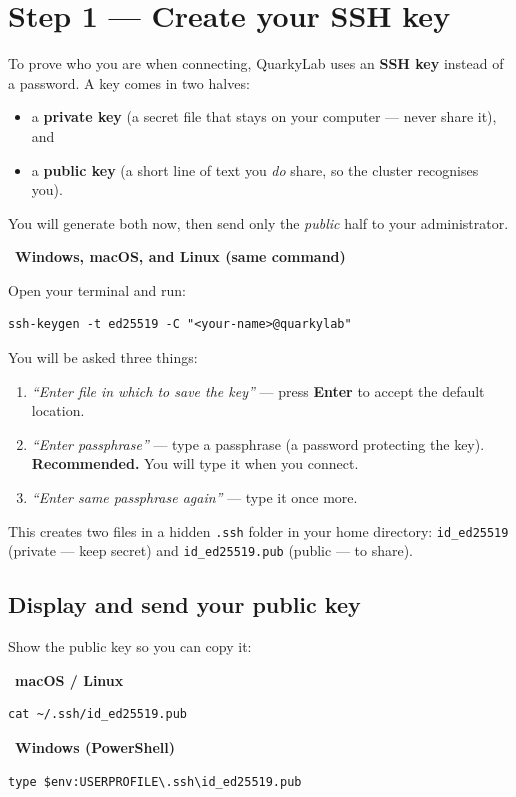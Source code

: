 \documentclass[11pt]{article}
\newcommand{\LabName}{QuarkyLab}                       %
\newcommand{\code}[1]{\texttt{#1}}
\newcommand{\osbadge}[1]{\vspace{0.4ex}\noindent{\color{quarkA}\rule{2pt}{10pt}}\ \textbf{\color{quarkA}#1}\par\nopagebreak\vspace{0.3ex}}
\begin{document}
\section{Step 1 --- Create your SSH key}
To prove who you are when connecting, \LabName{} uses an \textbf{SSH key} instead of a password. A key comes in two halves:
\begin{itemize}
  \item a \textbf{private key} (a secret file that stays on your computer --- never share it), and
  \item a \textbf{public key} (a short line of text you \emph{do} share, so the cluster recognises you).
\end{itemize}
You will generate both now, then send only the \emph{public} half to your administrator.

\osbadge{Windows, macOS, and Linux (same command)}
Open your terminal and run:
\begin{lstlisting}
ssh-keygen -t ed25519 -C "<your-name>@quarkylab"
\end{lstlisting}
You will be asked three things:
\begin{enumerate}
  \item \textit{``Enter file in which to save the key''} --- press \textbf{Enter} to accept the default location.
  \item \textit{``Enter passphrase''} --- type a passphrase (a password protecting the key). \textbf{Recommended.} You will type it when you connect.
  \item \textit{``Enter same passphrase again''} --- type it once more.
\end{enumerate}
This creates two files in a hidden \code{.ssh} folder in your home directory: \code{id\_ed25519} (private --- keep secret) and \code{id\_ed25519.pub} (public --- to share).

\subsection{Display and send your public key}
Show the public key so you can copy it:

\osbadge{macOS / Linux}
\begin{lstlisting}
cat ~/.ssh/id_ed25519.pub
\end{lstlisting}

\osbadge{Windows (PowerShell)}
\begin{lstlisting}
type $env:USERPROFILE\.ssh\id_ed25519.pub
\end{lstlisting}
\end{document}
